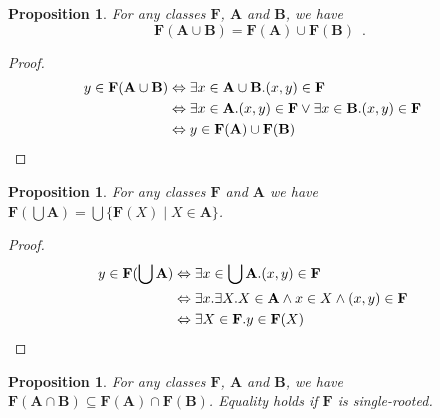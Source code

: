 \documentclass{book}
\let\qed\relax
\newtheorem{prop}[ax]{Proposition}
\theoremstyle{definition}
\begin{document}
\begin{prop}
For any classes $\mathbf{F}$, $\mathbf{A}$ and $\mathbf{B}$, we have
\[ \mathbf{F}(\mathbf{A} \cup \mathbf{B}) = \mathbf{F}(\mathbf{A}) \cup \mathbf{F}(\mathbf{B}) \enspace . \]
\end{prop}

\begin{proof}
\pf
\begin{align*}
	y \in \mathbf{F}(\mathbf{A} \cup \mathbf{B})
	& \Leftrightarrow \exists x \in \mathbf{A} \cup \mathbf{B}. (x,y) \in \mathbf{F} \\
	& \Leftrightarrow \exists x \in \mathbf{A}. (x,y) \in \mathbf{F} \vee \exists x \in \mathbf{B}. (x,y) \in \mathbf{F} \\
	& \Leftrightarrow y \in \mathbf{F}(\mathbf{A}) \cup \mathbf{F}(\mathbf{B}) & \qed
\end{align*}
\end{proof}

\begin{prop}
\label{prop:imgunion}
For any classes $\mathbf{F}$ and $\mathbf{A}$ we have $\mathbf{F}(\bigcup \mathbf{A}) = \bigcup \{\mathbf{F}(X) \mid X \in \mathbf{A}\}$.
\end{prop}

\begin{proof}
\pf
\begin{align*}
	y \in \mathbf{F}(\bigcup \mathbf{A}) & \Leftrightarrow \exists x \in \bigcup \mathbf{A}. (x,y) \in \mathbf{F} \\
	& \Leftrightarrow \exists x. \exists X. X \in \mathbf{A} \wedge x \in X \wedge (x,y) \in \mathbf{F} \\
	& \Leftrightarrow \exists X \in \mathbf{F}. y \in \mathbf{F}(X) & \qed
\end{align*}
\end{proof}

\begin{prop}
For any classes $\mathbf{F}$, $\mathbf{A}$ and $\mathbf{B}$, we have $\mathbf{F}(\mathbf{A} \cap \mathbf{B}) \subseteq \mathbf{F}(\mathbf{A}) \cap \mathbf{F}(\mathbf{B})$. Equality holds if $\mathbf{F}$ is single-rooted.
\end{prop}
\end{document}
